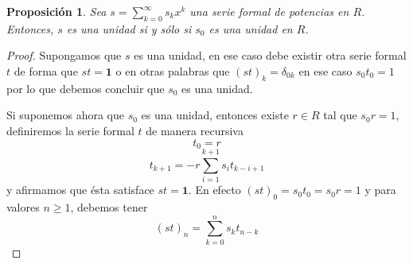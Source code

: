 \documentclass[letter,10pt,notitlepage]{article}
\newtheorem{proposition}{Proposición}
\theoremstyle{definition}
\theoremstyle{remark}
\begin{document}
\begin{proposition}
  Sea \( s = \sum_{k=0}^{\infty}s_kx^k\) una serie formal de potencias en \( R\). Entonces,
  \( s\) es una unidad si y sólo si \( s_0\) es una unidad en \( R\).
\end{proposition}
\begin{proof}
  Supongamos que \( s\) es una unidad, en ese caso debe existir otra serie formal \( t\)
  de forma que \( s t = \mathbf{1}\) o en otras palabras que \( (s t)_k = \delta_{0k}\) en ese caso
  \( s_0 t_0 = 1\) por lo que debemos concluir que \( s_0\) es una unidad.

  Si suponemos ahora que \( s_0\) es una unidad, entonces existe \( r \in R\) tal que \( s_0 r= 1\),
  definiremos la serie formal  \( t\) de manera recursiva
  \[ t_0 = r\]
  \[ t_{k+1} = -r \sum_{i=1}^{k+1}s_it_{k-i+1} \]
  y afirmamos que ésta satisface \( s t = \mathbf{1}\). En efecto \( (st)_0 = s_0t_0 = s_0r = 1\) y
  para valores \( n\geq 1\), debemos tener
  \[ (st)_n = \sum_{k=0}^{n}s_kt_{n-k}\] 
\end{proof} 
\end{document}
